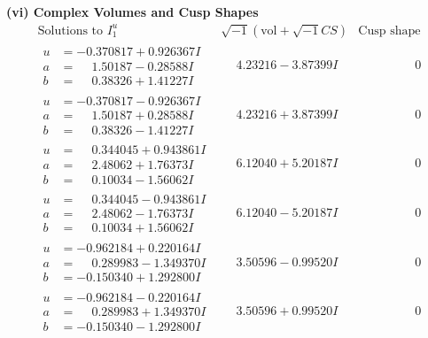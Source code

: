 \documentclass[1p]{elsarticle_modified}
\theoremstyle{definition}
\newcommand{\I}{\sqrt{-1}}
\begin{document}
\newpage\flushleft \textbf{(vi) Complex Volumes and Cusp Shapes}
$$\begin{array}{c|c|c}  
\text{Solutions to }I^u_{1}& \I (\text{vol} + \sqrt{-1}CS) & \text{Cusp shape}\\
 \hline 
\begin{aligned}
u &= -0.370817 + 0.926367 I \\
a &= \phantom{-}1.50187 - 0.28588 I \\
b &= \phantom{-}0.38326 + 1.41227 I\end{aligned}
 & \phantom{-}4.23216 - 3.87399 I & \phantom{-0.000000 } 0 \\ \hline\begin{aligned}
u &= -0.370817 - 0.926367 I \\
a &= \phantom{-}1.50187 + 0.28588 I \\
b &= \phantom{-}0.38326 - 1.41227 I\end{aligned}
 & \phantom{-}4.23216 + 3.87399 I & \phantom{-0.000000 } 0 \\ \hline\begin{aligned}
u &= \phantom{-}0.344045 + 0.943861 I \\
a &= \phantom{-}2.48062 + 1.76373 I \\
b &= \phantom{-}0.10034 - 1.56062 I\end{aligned}
 & \phantom{-}6.12040 + 5.20187 I & \phantom{-0.000000 } 0 \\ \hline\begin{aligned}
u &= \phantom{-}0.344045 - 0.943861 I \\
a &= \phantom{-}2.48062 - 1.76373 I \\
b &= \phantom{-}0.10034 + 1.56062 I\end{aligned}
 & \phantom{-}6.12040 - 5.20187 I & \phantom{-0.000000 } 0 \\ \hline\begin{aligned}
u &= -0.962184 + 0.220164 I \\
a &= \phantom{-}0.289983 - 1.349370 I \\
b &= -0.150340 + 1.292800 I\end{aligned}
 & \phantom{-}3.50596 - 0.99520 I & \phantom{-0.000000 } 0 \\ \hline\begin{aligned}
u &= -0.962184 - 0.220164 I \\
a &= \phantom{-}0.289983 + 1.349370 I \\
b &= -0.150340 - 1.292800 I\end{aligned}
 & \phantom{-}3.50596 + 0.99520 I & \phantom{-0.000000 } 0 \\ \hline\begin{aligned}

\end{aligned}
\end{array}$$
\end{document}
